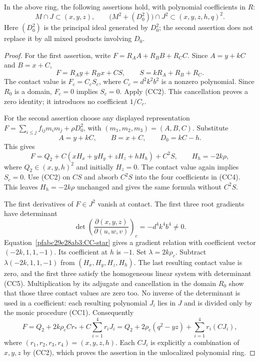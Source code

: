 \begin{lemma}
In the above ring, the following assertions hold, with polynomial
coefficients in $R$:
\[
 M\cap J\subset (x,y,z),\qquad
 \bigl(M^2+(D_0^2)\bigr)\cap J^2
       \subset (x,y,z,h,q)^2.                         \tag{CC3}
\]
Here $(D_0^2)$ is the principal ideal generated by $D_0^2$; the second
assertion does not replace it by all mixed products involving $D_0$.
\end{lemma}
\begin{proof}
For the first assertion, write $F=R_AA+R_BB+R_CC$. Since
$A=y+kC$ and $B=x+C$,
\[
 F=R_Ay+R_Bx+CS,\qquad S=kR_A+R_B+R_C.
\]
The contact value is $F_c=C_cS_c$, where $C_c=d^2k^2b^2$ is a nonzero
polynomial. Since $R_0$ is a domain, $F_c=0$ implies $S_c=0$.
Apply (CC2). This cancellation proves a zero identity; it introduces no
coefficient $1/C_c$.

For the second assertion choose any displayed representation
$F=\sum_{i\le j}f_{ij}m_im_j+\rho D_0^2$, with
$(m_1,m_2,m_3)=(A,B,C)$. Substitute
\[
 A=y+kC,\qquad B=x+C,\qquad D_0=kC-h.
\]
This gives
\[
 F=Q_2+C(xH_x+yH_y+zH_z+hH_h)+C^2S,\qquad H_h=-2k\rho,       \tag{CC4}
\]
where $Q_2\in(x,y,h)^2$ and initially $H_z=0$.
The contact value again implies $S_c=0$. Use (CC2) on $CS$ and absorb
$C^2S$ into the four coefficients in (CC4). This leaves $H_h=-2k\rho$
unchanged and gives the same formula without $C^2S$.

The first derivatives of $F\in J^2$ vanish at contact. The first three
root gradients have determinant
\[
 \det\left(\frac{\partial(x,y,z)}{\partial(u,w,v)}\right)_c
       =-d^4k^4b^4\ne0.                              \tag{CC5}
\]
Equation~\eqref{pfabc29e28ab3:CC-star} gives a gradient relation with coefficient vector
$(-2k,1,1,-1)$. Its coefficient at $h$ is $-1$.
Set $\lambda=2k\rho_c$. Subtract
$\lambda(-2k,1,1,-1)$ from $(H_x,H_y,H_z,H_h)$.
The last resulting contact value is zero, and the first three satisfy the
homogeneous linear system with determinant (CC5). Multiplication by its
adjugate and cancellation in the domain $R_0$ show that those three
contact values are zero too. No inverse of the determinant is used in a
coefficient: each resulting polynomial $J_i$ lies in $J$ and is divided
only by the monic procedure (CC1).
Consequently
\[
 F=Q_2+2k\rho_cCr_*+C\sum_{i=1}^4r_iJ_i
   =Q_2+2\rho_c(q^2-yz)+\sum_{i=1}^4r_i(CJ_i),          \tag{CC6}
\]
where $(r_1,r_2,r_3,r_4)=(x,y,z,h)$. Each $CJ_i$ is explicitly a
combination of $x,y,z$ by (CC2), which proves the assertion in the
unlocalized polynomial ring.
\end{proof}

